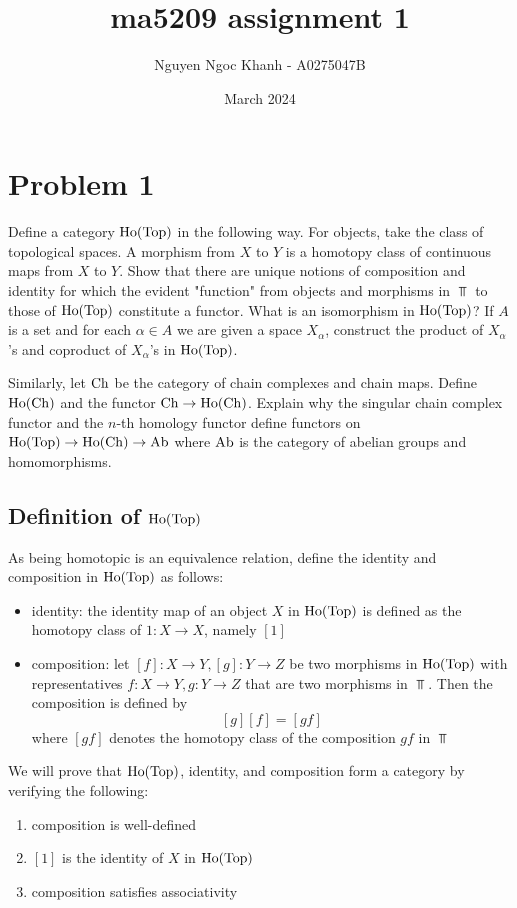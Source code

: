 \documentclass{article}
\title{ma5209 assignment 1}
\author{Nguyen Ngoc Khanh - A0275047B}
\date{March 2024}
\begin{document}
\maketitle

\section{Problem 1}
Define a category $\operatorname{Ho}(\operatorname{Top})$ in the following way. For objects, take the class of topological spaces. A morphism from $X$ to $Y$ is a homotopy class of continuous maps from $X$ to $Y$. Show that there are unique notions of composition and identity for which the evident "function" from objects and morphisms in $\Top$ to those of $\operatorname{Ho}(\operatorname{Top})$ constitute a functor. What is an isomorphism in $\operatorname{Ho}(\operatorname{Top})$? If $A$ is a set and for each $\alpha \in A$ we are given a space $X_\alpha$, construct the product of $X_\alpha$'s and coproduct of $X_\alpha$'s in $\operatorname{Ho}(\operatorname{Top})$.

Similarly, let $\operatorname{Ch}$ be the category of chain complexes and chain maps. Define $\operatorname{Ho}(\operatorname{Ch})$ and the functor $\operatorname{Ch} \to \operatorname{Ho}(\operatorname{Ch})$. Explain why the singular chain complex functor and the $n$-th homology functor define functors on $\operatorname{Ho}(\operatorname{Top}) \to \operatorname{Ho}(\operatorname{Ch}) \to \operatorname{Ab}$ where $\operatorname{Ab}$ is the category of abelian groups and homomorphisms.

\subsection{Definition of $\operatorname{Ho}(\operatorname{Top})$}
As being homotopic is an equivalence relation, define the identity and composition in $\operatorname{Ho}(\operatorname{Top})$ as follows:

\begin{itemize}
    \item identity: the identity map of an object $X$ in $\operatorname{Ho}(\operatorname{Top})$ is defined as the homotopy class of $1: X \to X$, namely $[1]$
    \item composition: let $[f]: X \to Y, [g]: Y \to Z$ be two morphisms in $\operatorname{Ho}(\operatorname{Top})$ with representatives $f: X \to Y, g: Y \to Z$ that are two morphisms in $\Top$. Then the composition is defined by
    $$
        [g] [f] = [gf]
    $$
    where $[gf]$ denotes the homotopy class of the composition $gf$ in $\Top$ 
\end{itemize}

We will prove that $\operatorname{Ho}(\operatorname{Top})$, identity, and composition form a category by verifying the following:
\begin{enumerate}
    \item composition is well-defined
    \item $[1]$ is the identity of $X$ in $\operatorname{Ho}(\operatorname{Top})$
    \item composition satisfies associativity
\end{enumerate}
\end{document}
